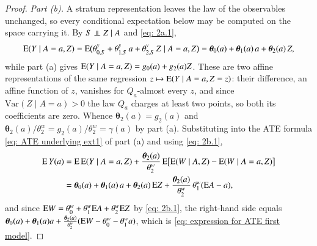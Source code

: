 \begin{proof}
\emph{Part (b).} A stratum representation leaves the law of the observables unchanged, so every conditional expectation below may be computed on the space carrying it. By $S \independent Z \mid A$ and \eqref{eq: 2a.1},
\[
\mathrm{E}(Y \mid A=a,Z) = \mathrm{E}\big(\theta_{0,S}^{y} + \theta_{1,S}^{y}\,a + \theta_{2,S}^{y}\,Z \mid A=a, Z\big) = \boldsymbol{\theta}_0(a) + \boldsymbol{\theta}_1(a)\,a + \boldsymbol{\theta}_2(a)\,Z,
\]
while part (a) gives $\mathrm{E}(Y \mid A=a,Z) = g_0(a) + g_2(a)Z$. These are two affine representations of the same regression $z \mapsto \mathrm{E}(Y \mid A=a,Z=z)$: their difference, an affine function of $z$, vanishes for $Q_a$-almost every $z$, and since $\mathrm{Var}(Z \mid A=a)>0$ the law $Q_a$ charges at least two points, so both its coefficients are zero. Whence $\boldsymbol{\theta}_2(a) = g_2(a)$ and $\boldsymbol{\theta}_2(a)/\theta_2^w = g_2(a)/\theta_2^w = \gamma(a)$ by part (a). Substituting into the ATE formula \eqref{eq: ATE underlying ext1} of part (a) and using \eqref{eq: 2b.1},
\begin{align*}
\mathrm{E} \, Y(a) &= \mathrm{E}\,\mathrm{E}(Y \mid A=a,Z) + \frac{\boldsymbol{\theta}_2(a)}{\theta_2^w}\, \mathrm{E}\big[\mathrm{E}(W \mid A,Z) - \mathrm{E}(W \mid A=a,Z)\big] \\
&= \boldsymbol{\theta}_0(a) + \boldsymbol{\theta}_1(a)\,a + \boldsymbol{\theta}_2(a)\,\mathrm{E} Z + \frac{\boldsymbol{\theta}_2(a)}{\theta_2^w}\,\theta_1^w(\mathrm{E} A - a),
\end{align*}
and since $\mathrm{E} W = \theta_0^w + \theta_1^w \mathrm{E} A + \theta_2^w \mathrm{E} Z$ by \eqref{eq: 2b.1}, the right-hand side equals $\boldsymbol{\theta}_0 (a) + \boldsymbol{\theta}_1 (a) a + \frac{\boldsymbol{\theta}_2(a)}{\theta_{2}^{w}} (\mathrm{E} W - \theta_{0}^{w} - \theta_{1}^{w} a)$, which is \eqref{eq: expression for ATE first model}.
\end{proof}

